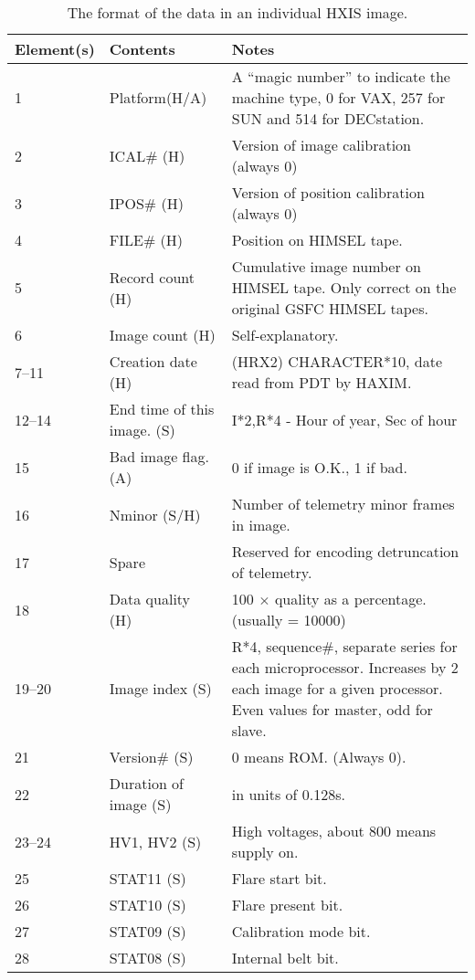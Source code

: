 \begin{table}
\begin{center}
\caption{\label{data} The format of the data in an individual HXIS image.}
{\small
\begin{tabular}{|llp{75mm}|} \hline
Element(s) & Contents &  Notes \\
\hline
1 & Platform\hfill(H/A) & A ``magic number'' to indicate the machine
type, 0 for VAX, 257 for SUN and 514 for DECstation. \\
2 & ICAL\# \hfill(H) & Version of image calibration (always 0)\\
3 & IPOS\# \hfill(H) & Version of position calibration (always 0)\\
4 & FILE\# \hfill(H) & Position on HIMSEL tape.\\
5 & Record count \hfill(H) & Cumulative image number on HIMSEL tape. Only correct on the
original GSFC HIMSEL tapes.\\
6 & Image count \hfill(H) & Self-explanatory. \\
7--11 & Creation date \hfill(H) & (HRX2) CHARACTER*10, date read from PDT by HAXIM.\\
12--14 & End time of this image. \hfill(S) & I*2,R*4 - Hour of year, Sec of hour\\
15 & Bad image flag. \hfill(A) & 0 if image is O.K., 1 if bad.\\
16 & Nminor \hfill(S/H) & Number of telemetry minor frames in image.\\
17 & Spare & Reserved for encoding detruncation of telemetry.\\
18 & Data quality \hfill(H) & 100 $\times$ quality as a percentage. (usually
= 10000)\\
19--20 & Image index \hfill(S) & R*4, sequence\#, separate series for each
microprocessor.
Increases by 2 each image for a given processor. Even values for master,
odd for slave.\\
21 & Version\# \hfill(S) & 0 means ROM. (Always 0). \\
22 & Duration of image \hfill(S) & in units of 0.128s.\\
23--24 & HV1, HV2 \hfill(S) & High voltages, about 800 means supply on.\\
25 & STAT11 \hfill (S) & Flare start bit. \\
26 & STAT10 \hfill (S) & Flare present bit. \\
27 & STAT09 \hfill (S) & Calibration mode bit. \\
28 & STAT08 \hfill (S) & Internal belt bit. \\

\end{tabular}}
\end{center}
\end{table}
